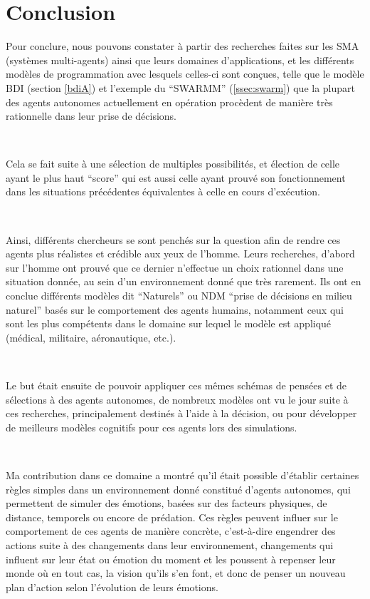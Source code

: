 \chapter{Conclusion} %

\label{Chapter7} %

Pour conclure, nous pouvons constater à partir des recherches faites sur les SMA (systèmes multi-agents) ainsi que leurs domaines d’applications, et les différents modèles de programmation avec lesquels celles-ci sont conçues, telle que le modèle BDI (section \ref{bdiA}) et l'exemple du “SWARMM” (\ref{ssec:swarm}) que la plupart des agents autonomes  actuellement en opération procèdent de manière très rationnelle dans leur prise de décisions.

~\par
Cela se fait suite à une sélection de multiples possibilités, et élection de celle ayant le plus haut “score” qui est aussi celle ayant prouvé son fonctionnement dans les situations précédentes équivalentes à celle en cours d'exécution.

~\par
Ainsi, différents chercheurs se sont penchés sur la question afin de rendre ces agents plus réalistes et crédible aux yeux de l’homme. Leurs recherches, d’abord sur l’homme ont prouvé que ce dernier n'effectue un choix rationnel dans une situation donnée, au sein d’un environnement donné que très rarement. Ils ont en conclue différents modèles dit “Naturels” ou NDM “prise de décisions en milieu naturel” basés sur le comportement des agents humains, notamment ceux qui sont les plus compétents dans le domaine sur lequel le modèle est appliqué (médical, militaire, aéronautique, etc.).

~\par
Le but était ensuite de pouvoir appliquer ces mêmes schémas de pensées et de sélections à des agents autonomes, de nombreux modèles ont vu le jour suite à ces recherches, principalement destinés à l’aide à la décision, ou pour développer de meilleurs modèles cognitifs pour ces agents lors des simulations.

~\par
Ma contribution dans ce domaine a montré qu’il était possible d’établir certaines règles simples dans un environnement donné constitué d’agents autonomes, qui permettent de simuler des émotions, basées sur des facteurs physiques, de distance, temporels ou encore de prédation. Ces règles peuvent influer sur le comportement de ces agents de manière concrète, c’est-à-dire engendrer des actions suite à des changements dans leur environnement, changements qui influent sur leur état ou émotion du moment et les poussent à repenser leur monde où en tout cas, la vision qu’ils s’en font, et donc de penser un nouveau plan d’action selon l’évolution de leurs émotions.

